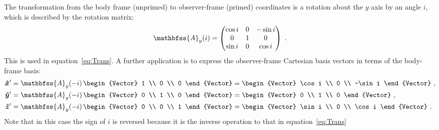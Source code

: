 The transformation from the body frame (unprimed) to observer-frame
(primed) coordinates is a rotation about the \(y\) axis by an angle
\(i\), which is described by the rotation matrix:
\begin{equation}
  \label{eq:Rotation-matrix-y}
  \mathbfss{A}_y(i) = 
   \begin{pmatrix}
    \cos i & 0 & -\sin i \\
    0 & 1 & 0 \\
    \sin i & 0 &\cos i 
  \end{pmatrix} \ .
\end{equation}
This is used in equation~\eqref{eq:Trans}.  A further application is
to express the observer-frame Cartesian basis vectors in terms of the
body-frame basis:
\begin{align}
  \label{eq:xunit-prime}
  \uvec{x}' &= \mathbfss{A}_y(-i)\, %
              \begin{Vector}
              1 \\ 0 \\ 0  
              \end{Vector}
              =
              \begin{Vector}
              \cos i \\ 0 \\ -\sin i  
              \end{Vector} \ ,
  \\
  \label{eq:yunit-prime}
  \uvec{y}' &= \mathbfss{A}_y(-i)\, %
              \begin{Vector}
              0 \\ 1 \\ 0  
              \end{Vector}
              =
              \begin{Vector}
              0 \\ 1 \\ 0
              \end{Vector} \ , 
  \\
  \label{eq:zunit-prime}
  \uvec{z}' &= \mathbfss{A}_y(-i)\, %
              \begin{Vector}
              0 \\ 0 \\ 1  
              \end{Vector}
              =
              \begin{Vector}
              \sin i \\ 0 \\ \cos i  
              \end{Vector} \ .
\end{align}
Note that in this case the sign of \(i\) is reversed because it is the
inverse operation to that in equation~\eqref{eq:Trans}


